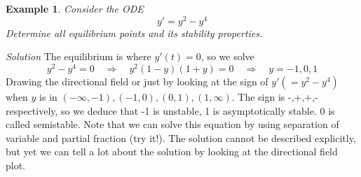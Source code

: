 \documentclass[10pt]{amsart}
\newtheorem{example}{Example}
\renewcommand{\ni}{\noindent}
\newcommand{\ti}{\textit}
\newcommand{\imply}{ \quad \Rightarrow \quad}
\newcommand{\bex}{\begin{example}}
\newcommand{\eex}{\end{example}}
\begin{document}
\vspace{0.2in}
\bex Consider the ODE
$$ y'  = y^{2}-y^{4} $$
Determine all equilibrium points and its stability properties.
\eex
\ni\ti{Solution} The equilibrium is where $y'(t) = 0$, so we solve
$$ y^{2} - y^{4} = 0 \imply y^{2}(1-y)(1+y) = 0 \imply y = -1,0,1 $$
Drawing the directional field or just by looking at the sign of $y' (= y^{2}-y^{4})$ when $y$ is in $(-\infty, -1), (-1,0), (0,1), (1,\infty)$. The sign is -,+,+,- respectively, so we deduce that -1 is unstable, 1 is asymptotically stable. 0 is called semistable. Note that we can solve this equation by using separation of variable and partial fraction (try it!). The solution cannot be described explicitly, but yet we can tell a lot about the solution by looking at the directional field plot.
 
 
 


 
\end{document}
